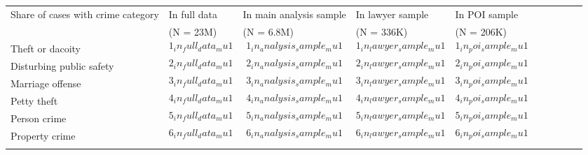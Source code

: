 {
\begin{tabular}{>{\centering\arraybackslash}m{4cm}>{\centering\arraybackslash}m{2cm}>{\centering\arraybackslash}m{2cm}>{\centering\arraybackslash}m{2cm}>{\centering\arraybackslash}m{2cm}>{\centering\arraybackslash}m{2cm}>{\centering\arraybackslash}m{2cm}>{\centering\arraybackslash}m{2cm}>{\centering\arraybackslash}m{2cm}>{\centering\arraybackslash}m{2cm}}
 
\hline \hline

\vspace{0.2cm}
Share of cases with crime category & In full data & In main analysis sample  & In lawyer sample  & In POI sample \\

& (N = 23M) & (N = 6.8M) & (N = 336K) & (N = 206K)  \\

\hline
\vspace{0.2cm}

Theft or dacoity & $$1_in_full_data_mu1$$ & $$1_in_analysis_sample_mu1$$ &  $$1_in_lawyer_sample_mu1$$ &  $$1_in_poi_sample_mu1$$ \\

\vspace{0.2cm}

Disturbing public safety & $$2_in_full_data_mu1$$ & $$2_in_analysis_sample_mu1$$ &  $$2_in_lawyer_sample_mu1$$ &  $$2_in_poi_sample_mu1$$ \\

\vspace{0.2cm}

Marriage offense & $$3_in_full_data_mu1$$ & $$3_in_analysis_sample_mu1$$ &  $$3_in_lawyer_sample_mu1$$ &  $$3_in_poi_sample_mu1$$ \\

\vspace{0.2cm}

Petty theft & $$4_in_full_data_mu1$$ & $$4_in_analysis_sample_mu1$$ &  $$4_in_lawyer_sample_mu1$$ &  $$4_in_poi_sample_mu1$$ \\
\vspace{0.2cm}

Person crime & $$5_in_full_data_mu1$$ & $$5_in_analysis_sample_mu1$$ &  $$5_in_lawyer_sample_mu1$$ &  $$5_in_poi_sample_mu1$$ \\
\vspace{0.2cm}

Property crime & $$6_in_full_data_mu1$$ & $$6_in_analysis_sample_mu1$$ &  $$6_in_lawyer_sample_mu1$$ &  $$6_in_poi_sample_mu1$$ \\
\vspace{0.2cm}


\end{tabular}}
